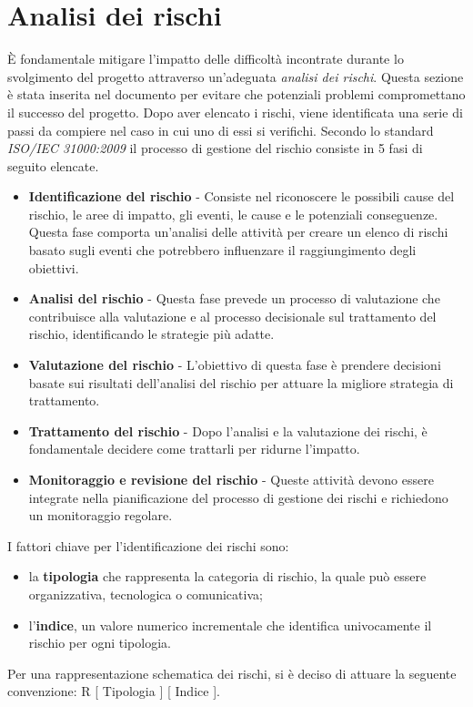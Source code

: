 \section{Analisi dei rischi} %
È fondamentale mitigare l'impatto delle difficoltà incontrate durante lo svolgimento del progetto attraverso un'adeguata \textit{analisi dei rischi}. Questa sezione è stata inserita nel documento per evitare che potenziali problemi compromettano il successo del progetto.
Dopo aver elencato i rischi, viene identificata una serie di passi da compiere nel caso in cui uno di essi si verifichi. Secondo lo standard \textit{ISO/IEC 31000:2009} il processo di gestione del rischio consiste in 5 fasi di seguito elencate.
\begin{itemize}
	\item \textbf{Identificazione del rischio} - Consiste nel riconoscere le possibili cause del rischio, le aree di impatto, gli eventi, le cause e le potenziali conseguenze. Questa fase comporta un'analisi delle attività per creare un elenco di rischi basato sugli eventi che potrebbero influenzare il raggiungimento degli obiettivi.
	\item \textbf{Analisi del rischio} - Questa fase prevede un processo di valutazione che contribuisce alla valutazione e al processo decisionale sul trattamento del rischio, identificando le strategie più adatte.
	\item \textbf{Valutazione del rischio} - L'obiettivo di questa fase è prendere decisioni basate sui risultati dell'analisi del rischio per attuare la migliore strategia di trattamento.
	\item \textbf{Trattamento del rischio} - Dopo l'analisi e la valutazione dei rischi, è fondamentale decidere come trattarli per ridurne l'impatto.
	\item \textbf{Monitoraggio e revisione del rischio} - Queste attività devono essere integrate nella pianificazione del processo di gestione dei rischi e richiedono un monitoraggio regolare.
\end{itemize}
I fattori chiave per l'identificazione dei rischi sono:
\begin{itemize}
    \item la \textbf{tipologia} che rappresenta la categoria di rischio, la quale può essere organizzativa, tecnologica o comunicativa;
    \item l'\textbf{indice}, un valore numerico incrementale che identifica univocamente il rischio per ogni tipologia.
\end{itemize}
Per una rappresentazione schematica dei rischi, si è deciso di attuare la seguente convenzione: R [ Tipologia ] [ Indice ].

